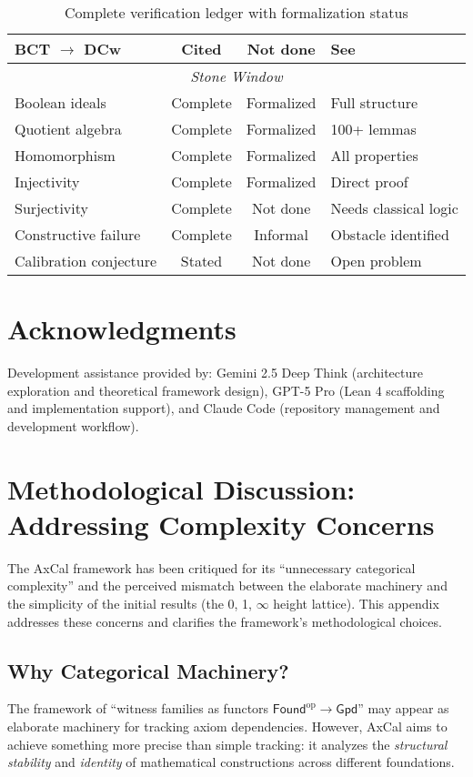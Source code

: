\documentclass[11pt]{article}
\theoremstyle{plain}
\theoremstyle{definition}
\newcommand{\Found}{\mathsf{Found}}
\newcommand{\Gpd}{\mathsf{Gpd}}
\begin{document}
\begin{table}[h]
\begin{tabular}{|l|c|c|l|}
BCT $\rightarrow$ DCw & Cited & Not done & See \cite{Blair77} \\
\hline
\multicolumn{4}{|c|}{\textit{Stone Window}} \\
\hline
Boolean ideals & Complete & Formalized & Full structure \\
Quotient algebra & Complete & Formalized & 100+ lemmas \\
Homomorphism & Complete & Formalized & All properties \\
Injectivity & Complete & Formalized & Direct proof \\
Surjectivity & Complete & Not done & Needs classical logic \\
Constructive failure & Complete & Informal & Obstacle identified \\
Calibration conjecture & Stated & Not done & Open problem \\
\hline
\end{tabular}
\caption{Complete verification ledger with formalization status}
\label{tab:complete-ledger}
\end{table}

\section*{Acknowledgments}
Development assistance provided by: Gemini 2.5 Deep Think (architecture exploration and theoretical framework design), GPT-5 Pro (Lean 4 scaffolding and implementation support), and Claude Code (repository management and development workflow).

\appendix

\section{Methodological Discussion: Addressing Complexity Concerns}
\label{app:methodology}

The AxCal framework has been critiqued for its ``unnecessary categorical complexity'' and the perceived mismatch between the elaborate machinery and the simplicity of the initial results (the 0, 1, $\infty$ height lattice). This appendix addresses these concerns and clarifies the framework's methodological choices.

\subsection{Why Categorical Machinery?}

The framework of ``witness families as functors $\Found^{\mathrm{op}} \to \Gpd$'' may appear as elaborate machinery for tracking axiom dependencies. However, AxCal aims to achieve something more precise than simple tracking: it analyzes the \emph{structural stability} and \emph{identity} of mathematical constructions across different foundations.
\end{document}

